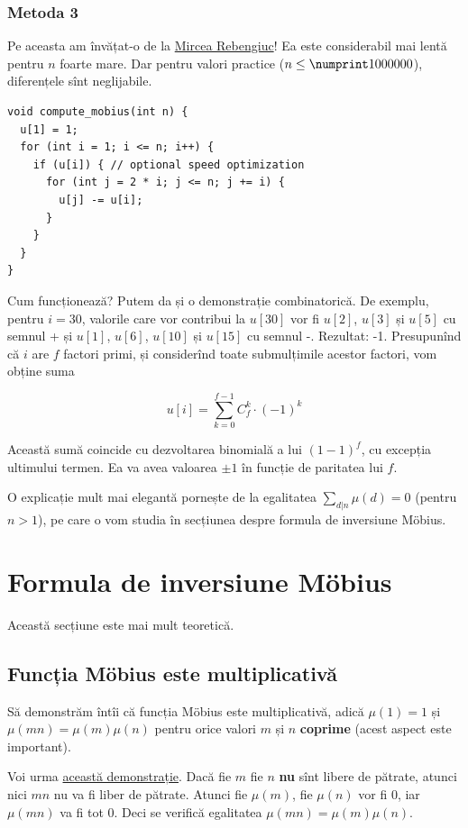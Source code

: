 \documentclass[../main.tex]{subfiles}
\begin{document}
\subsubsection*{Metoda 3}
\label{subsubseq:mobius-method-3}

Pe aceasta am învățat-o de la \href{https://kilonova.ro/submissions/84735}{Mircea Rebengiuc}! Ea este considerabil mai lentă pentru $n$ foarte mare. Dar pentru valori practice ($n \leq \np{1000000}$), diferențele sînt neglijabile.

\begin{verbatim}
void compute_mobius(int n) {
  u[1] = 1;
  for (int i = 1; i <= n; i++) {
    if (u[i]) { // optional speed optimization
      for (int j = 2 * i; j <= n; j += i) {
        u[j] -= u[i];
      }
    }
  }
}
\end{verbatim}

Cum funcționează? Putem da și o demonstrație combinatorică. De exemplu, pentru $i = 30$, valorile care vor contribui la $u[30]$ vor fi $u[2]$, $u[3]$ și $u[5]$ cu semnul + și $u[1]$, $u[6]$, $u[10]$ și $u[15]$ cu semnul -. Rezultat: -1. Presupunînd că $i$ are $f$ factori primi, și considerînd toate submulțimile acestor factori, vom obține suma

$$u[i] = \sum_{k=0}^{f-1} C_f^k \cdot (-1)^k$$

Această sumă coincide cu dezvoltarea binomială a lui $(1 - 1)^f$, cu excepția ultimului termen. Ea va avea valoarea $\pm 1$ în funcție de paritatea lui $f$.

O explicație mult mai elegantă pornește de la egalitatea $\sum_{d|n} \mu(d) = 0$ (pentru $n > 1$), pe care o vom studia în secțiunea despre formula de inversiune Möbius.

\section{Formula de inversiune Möbius}

Această secțiune este mai mult teoretică.

\subsection{Funcția Möbius este multiplicativă}

Să demonstrăm întîi că funcția Möbius este multiplicativă, adică $\mu(1) = 1$ și $\mu(mn) = \mu(m)\mu(n)$ pentru orice valori $m$ și $n$ \textbf{coprime} (acest aspect este important).

Voi urma \href{https://math.stackexchange.com/a/895388}{această demonstrație}. Dacă fie $m$ fie $n$ \textbf{nu} sînt libere de pătrate, atunci nici $mn$ nu va fi liber de pătrate. Atunci fie $\mu(m)$, fie $\mu(n)$ vor fi 0, iar $\mu(mn)$ va fi tot 0. Deci se verifică egalitatea $\mu(mn) = \mu(m)\mu(n)$.
\end{document}
